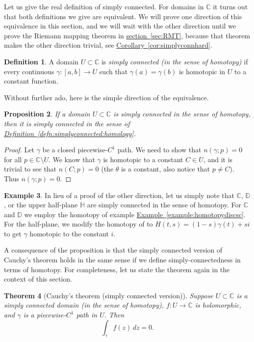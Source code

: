 \documentclass[12pt,openany]{book}
\newcommand{\C}{{\mathbb{C}}}
\newcommand{\D}{{\mathbb{D}}}
\newcommand{\bH}{{\mathbb{H}}}
\newcommand{\myindex}[1]{#1\index{#1}}
\theoremstyle{plain}
\newtheorem{thm}{Theorem}[section]
\newtheorem{prop}[thm]{Proposition}
\theoremstyle{remark}
\theoremstyle{definition}
\newtheorem{defn}[thm]{Definition}
\theoremstyle{exercise}
\theoremstyle{example}
\newtheorem{example}[thm]{Example}
\newcommand{\sectionref}[1]{\hyperref[#1]{section~\ref*{#1}}}
\newcommand{\exampleref}[1]{\hyperref[#1]{Example~\ref*{#1}}}
\newcommand{\corref}[1]{\hyperref[#1]{Corollary~\ref*{#1}}}
\newcommand{\defnref}[1]{\hyperref[#1]{Definition~\ref*{#1}}}
\begin{document}
Let us give the real definition of simply connected.
For domains in $\C$ it
turns out that both definitions we give are equivalent.
We will prove one direction of this equivalence in this section,
and we will wait with the other direction until we prove the Riemann
mapping theorem in \sectionref{sec:RMT},
because that theorem makes the other direction trivial, see
\corref{cor:simplyconnhard}.

\begin{defn}
A domain $U \subset \C$ is
\emph{\myindex{simply connected (in the sense of homotopy)}}
if every continuous $\gamma \colon [a,b] \to U$ such that $\gamma(a) =
\gamma(b)$ is homotopic in $U$ to a constant function.
\end{defn}

Without further ado, here is the simple direction of the equivalence.

\begin{prop} \label{prop:simplyconneasy}
If a domain $U \subset \C$ is simply connected in the sense of homotopy,
then it is simply connected in the sense
of \defnref{defn:simplyconnected:homology}.
\end{prop}

\begin{proof}
Let $\gamma$ be a closed piecewise-$C^1$ path.  We need to show
that $n(\gamma;p) = 0$ for all $p \in \C \setminus U$.
We know that $\gamma$ is homotopic to a constant $C \in U$, and it is
trivial to see that $n(C;p) = 0$ (the $\theta$
is a constant, also notice that $p \not= C$).
Thus $n(\gamma;p) = 0$.
\end{proof}

\begin{example}
In lieu of a proof of the other direction, let us simply note that
$\C$, $\D$, or the upper half-plane $\bH$ are simply connected in the 
sense of homotopy.  For $\C$ and $\D$ we employ the homotopy of
example \exampleref{example:homotopydiscsc}.  For the half-plane,
we modify the homotopy of to $H(t,s) = (1-s)\gamma(t) + si$ to
get $\gamma$ homotopic to the constant $i$.
\end{example}

A consequence of the proposition is that
the simply connected version of Cauchy's theorem holds in the same
sense if we define simply-connectedness in terms of homotopy.  For
completeness, let us state the theorem again in the context of this section.

\begin{thm}[Cauchy's theorem (simply connected version)]
%
Suppose $U \subset \C$ is a simply connected domain (in the sense of
homotopy), $f \colon U \to \C$ is holomorphic,
and $\gamma$ is a piecewise-$C^1$ path in $U$.  Then
\begin{equation*}
\int_{\gamma} f(z) \, dz = 0 .
\end{equation*}
\end{thm}
\end{document}
